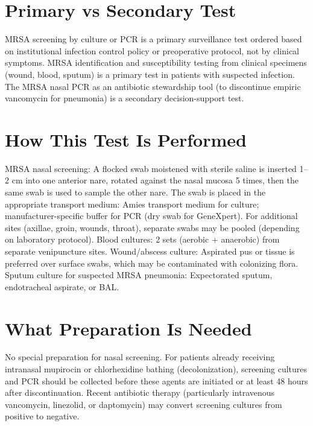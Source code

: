 \section*{Primary vs Secondary Test}
MRSA screening by culture or PCR is a primary surveillance test ordered based on institutional infection control policy or preoperative protocol, not by clinical symptoms. MRSA identification and susceptibility testing from clinical specimens (wound, blood, sputum) is a primary test in patients with suspected infection. The MRSA nasal PCR as an antibiotic stewardship tool (to discontinue empiric vancomycin for pneumonia) is a secondary decision-support test.

\section*{How This Test Is Performed}
MRSA nasal screening: A flocked swab moistened with sterile saline is inserted 1--2 cm into one anterior nare, rotated against the nasal mucosa 5 times, then the same swab is used to sample the other nare. The swab is placed in the appropriate transport medium: Amies transport medium for culture; manufacturer-specific buffer for PCR (dry swab for GeneXpert). For additional sites (axillae, groin, wounds, throat), separate swabs may be pooled (depending on laboratory protocol). Blood cultures: 2 sets (aerobic + anaerobic) from separate venipuncture sites. Wound/abscess culture: Aspirated pus or tissue is preferred over surface swabs, which may be contaminated with colonizing flora. Sputum culture for suspected MRSA pneumonia: Expectorated sputum, endotracheal aspirate, or BAL.

\section*{What Preparation Is Needed}
No special preparation for nasal screening. For patients already receiving intranasal mupirocin or chlorhexidine bathing (decolonization), screening cultures and PCR should be collected before these agents are initiated or at least 48 hours after discontinuation. Recent antibiotic therapy (particularly intravenous vancomycin, linezolid, or daptomycin) may convert screening cultures from positive to negative.

